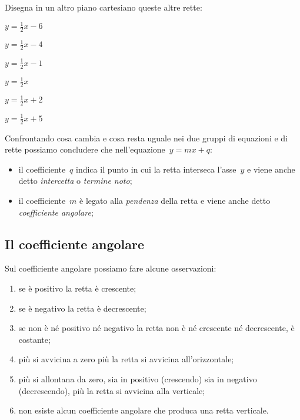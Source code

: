 Disegna in un altro piano cartesiano queste altre rette:

\begin{multicols}{3}
 \TabPositions{0.6cm}
 \begin{enumeratea}
 \item \(y=\frac{1}{2}x - 6\)
 \item \(y=\frac{1}{2}x -4\)
 \item \(y=\frac{1}{2}x -1\)
 \item \(y=\frac{1}{2}x\)
 \item \(y=\frac{1}{2}x + 2\)
 \item \(y=\frac{1}{2}x + 5\)
 \end{enumeratea}
\end{multicols}

Confrontando cosa cambia e cosa resta uguale nei due gruppi di equazioni 
e di rette possiamo concludere che nell'equazione~\(y=mx+q\):

\begin{itemize}
 \item il coefficiente~\(q\) indica il punto in cui la retta interseca 
  l'asse~\(y\) e viene anche detto \emph{intercetta} o \emph{termine noto};
 \item il coefficiente~\(m\) è legato alla \emph{pendenza} della retta
  e viene anche detto \emph{coefficiente angolare};
\end{itemize}

\subsection{Il coefficiente angolare}

Sul coefficiente angolare possiamo fare alcune osservazioni:

\begin{enumerate}
 \item se è positivo la retta è crescente;
 \item se è negativo la retta è decrescente;
 \item se non è né positivo né negativo la retta non è né crescente né
 decrescente, è costante;
 \item più si avvicina a zero più la retta si avvicina all'orizzontale;
 \item più si allontana da zero, sia in positivo (crescendo) sia in
  negativo (decrescendo), più la retta si avvicina alla verticale;
 \item non esiste alcun coefficiente angolare che produca 
  una retta verticale.
\end{enumerate}

